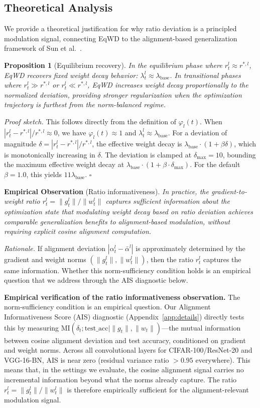 \documentclass{article}
\begin{document}
\subsection{Theoretical Analysis}
\label{sec:theory}

We provide a theoretical justification for why ratio deviation is a
principled modulation signal, connecting EqWD to the alignment-based
generalization framework of Sun et al.~\citep{sun2025cvpr}.

\textbf{Proposition 1} (Equilibrium recovery). \emph{In the equilibrium
phase where $r_t^l \approx r^{*,l}$, EqWD recovers fixed weight decay
behavior: $\lambda_t^l \approx \lambda_{\text{base}}$. In transitional
phases where $r_t^l \gg r^{*,l}$ or $r_t^l \ll r^{*,l}$, EqWD
increases weight decay proportionally to the normalized deviation,
providing stronger regularization when the optimization trajectory is
furthest from the norm-balanced regime.}

\emph{Proof sketch.} This follows directly from the definition of
$\varphi_l(t)$. When $|r_t^l - r^{*,l}| / r^{*,l} \approx 0$, we
have $\varphi_l(t) \approx 1$ and
$\lambda_t^l \approx \lambda_{\text{base}}$. For a deviation of
magnitude $\delta = |r_t^l - r^{*,l}| / r^{*,l}$, the effective weight
decay is $\lambda_{\text{base}} \cdot (1 + \beta \delta)$, which is
monotonically increasing in $\delta$. The deviation is clamped at
$\delta_{\max} = 10$, bounding the maximum effective weight decay at
$\lambda_{\text{base}} \cdot (1 + \beta \cdot \delta_{\max})$. For the
default $\beta = 1.0$, this yields $11\lambda_{\text{base}}$.
\hfill$\square$

\textbf{Empirical Observation} (Ratio informativeness). \emph{In practice, the gradient-to-weight ratio
$r_t^l = \|g_t^l\| / \|w_t^l\|$ captures sufficient information about the
optimization state that modulating weight decay based on ratio deviation
achieves comparable generalization benefits to alignment-based modulation,
without requiring explicit cosine alignment computation.}

\emph{Rationale.} If alignment deviation
$|\alpha_t^l - \bar{\alpha}^l|$ is approximately determined by the gradient and weight norms
$(\|g_t^l\|, \|w_t^l\|)$, then the ratio $r_t^l$ captures the same
information. Whether this norm-sufficiency condition holds is an empirical question
that we address through the AIS diagnostic below.

\textbf{Empirical verification of the ratio informativeness observation.} The norm-sufficiency
condition is an empirical question. Our Alignment Informativeness Score
(AIS) diagnostic (Appendix~\ref{app:details}) directly tests this by measuring
$\text{MI}(\hat{\delta}_t; \text{test\_acc} \mid \|g_t\|, \|w_t\|)$---the
mutual information between cosine alignment deviation and test accuracy,
conditioned on gradient and weight norms. Across all convolutional
layers for CIFAR-100/ResNet-20 and VGG-16-BN, AIS is near zero (residual
variance ratio $> 0.95$ everywhere). This means that, in the settings
we evaluate, the cosine alignment signal carries no incremental
information beyond what the norms already capture. The ratio
$r_t^l = \|g_t^l\| / \|w_t^l\|$ is therefore empirically sufficient
for the alignment-relevant modulation signal.
\end{document}
